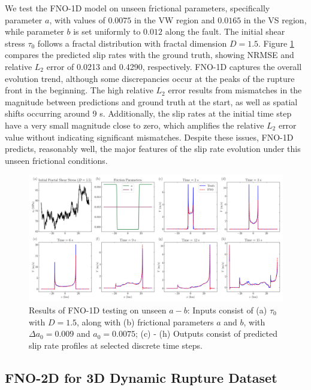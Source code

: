 \documentclass[draft]{agujournal2019}
\begin{document}
We test the FNO-1D model on unseen frictional parameters, specifically parameter \( a \), with values of \(0.0075\) in the VW region and \(0.0165\) in the VS region, while parameter \( b \) is set uniformly to \(0.012\) along the fault. The initial shear stress \(\tau_{0}\) follows a fractal distribution with fractal dimension \(D = 1.5\). Figure \ref{fig:2D_unseen_ab} compares the predicted slip rates with the ground truth, showing NRMSE and relative \(L_2\) error of 0.0213 and 0.4290, respectively. FNO-1D captures the overall evolution trend, although some discrepancies occur at the peaks of the rupture front in the beginning. The high relative \(L_2\) error results from mismatches in the magnitude between predictions and ground truth at the start, as well as spatial shifts occurring around 9 s. Additionally, the slip rates at the initial time step have a very small magnitude close to zero, which amplifies the relative \(L_2\) error value without indicating significant mismatches. Despite these issues, FNO-1D predicts, reasonably well, the major features of the slip rate evolution under this unseen frictional conditions. 

\begin{figure}
\centering
\includegraphics[width=1.0\linewidth]{2D_fractal_unseenab.png}
\caption{\label{fig:2D_unseen_ab}Results of FNO-1D testing on unseen $a-b$: Inputs consist of (a) \(\tau_{0}\) with \(D = 1.5\), along with (b) frictional parameters \(a\) and \(b\), with \(\Delta a_{0} = 0.009\) and \(a_{0} = 0.0075\); (c) - (h) Outputs consist of predicted slip rate profiles at selected discrete time steps.
}
\end{figure}

\subsection{FNO-2D for 3D Dynamic Rupture Dataset}
\label{sec:FNO-2D}
\end{document}
